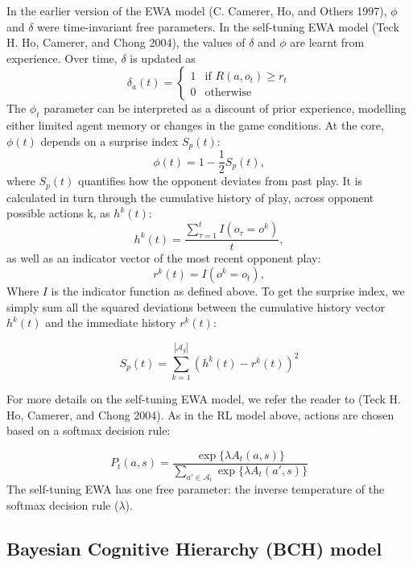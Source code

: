 \documentclass[smallextended]{svjour3}       %
\begin{document}
In the earlier version of the EWA model (C. Camerer, Ho, and Others
1997), \(\phi\) and \(\delta\) were time-invariant free parameters. In
the self-tuning EWA model (Teck H. Ho, Camerer, and Chong 2004), the
values of \(\delta\) and \(\phi\) are learnt from experience. Over time,
\(\delta\) is updated as
\[\delta_{a}(t) = \begin{cases} 1 & \text{if }  R(a,o_{t}) \geq r_{t}  \\
0 & \text{otherwise} \end{cases}\] The \(\phi_{t}\) parameter can be
interpreted as a discount of prior experience, modelling either limited
agent memory or changes in the game conditions. At the core, \(\phi(t)\)
depends on a surprise index \(S_{p}(t)\):
\[\phi(t) = 1 - \frac{1}{2}S_{p}(t) ,\] where \(S_{p}(t)\) quantifies
how the opponent deviates from past play. It is calculated in turn
through the cumulative history of play, across opponent possible actions
k, as \(h^{k}(t)\):
\[h^{k}(t)= \frac{ \sum_{\tau = 1}^t  I( o_{\tau} = o^k )} {t}, \] as
well as an indicator vector of the most recent opponent play:
\[r^k(t) = I(o^k=o_{t}), \] Where \(I\) is the indicator function as
defined above. To get the surprise index, we simply sum all the squared
deviations between the cumulative history vector \(h^{k}(t)\) and the
immediate history \(r^k(t)\):

\[S_{p}(t) = \sum_{k=1}^{|\mathcal{A}_g|} (h^{k}(t) - r^k(t))^2 \]

For more details on the self-tuning EWA model, we refer the reader to
(Teck H. Ho, Camerer, and Chong 2004). As in the RL model above, actions
are chosen based on a softmax decision rule:

\[P_t(a,s) = \frac{\exp \{\lambda  A_{t}(a,s) \} }{\sum_{a' \in \mathcal{A}_t} \exp \{ \lambda A_{t}(a',s) \} } \]
The self-tuning EWA has one free parameter: the inverse temperature of
the softmax decision rule (\(\lambda\)).

\hypertarget{bayesian-cognitive-hierarchy-bch-model}{%
\subsection{Bayesian Cognitive Hierarchy (BCH)
model}\label{bayesian-cognitive-hierarchy-bch-model}}
\end{document}
